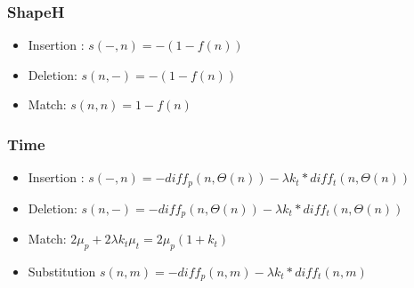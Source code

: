 \documentclass{beamer}
\begin{document}
	\begin{frame}
        \frametitle{ShapeH}
        \begin{minipage}{0.45\textwidth}
            \begin{itemize}
             \item Insertion : $ s(-, n) = -(1 - f(n))$
             \item Deletion: $s(n, -) = -(1 - f(n))$
             \item Match: $s(n, n) = 1 - f(n)$
            \end{itemize}
        \end{minipage}
        \begin{minipage}{0.45\textwidth}
        \end{minipage}
	\end{frame}
	
	\begin{frame}
        \frametitle{Time}
            \begin{itemize}
             \item Insertion : $ s(-, n) = -diff_p(n,\Theta (n)) - \lambda k_t * diff_t(n,\Theta (n))$
             \item Deletion: $s(n, -) = -diff_p(n,\Theta (n)) - \lambda k_t * diff_t(n,\Theta (n))$
             \item Match: $2\mu_p + 2\lambda k_t\mu_t = 2\mu_p(1+k_t)$
             \item Substitution $s(n,m) = -diff_p(n,m) - \lambda k_t * diff_t(n,m)$
            \end{itemize}
            \begin{center}
            \end{center}
	\end{frame}
	
\end{document}
